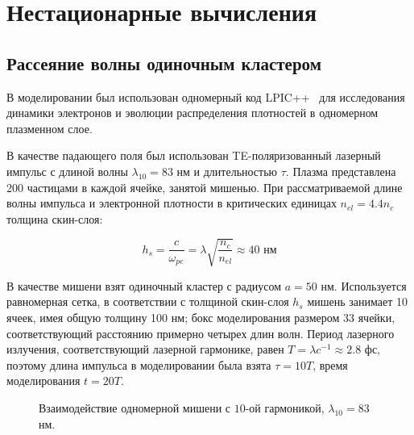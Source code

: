 \section{Нестационарные вычисления}

\subsection{Рассеяние волны одиночным кластером}

В моделировании был использован одномерный код LPIC++~\cite{Pfund1998} для исследования динамики электронов и эволюции распределения плотностей в одномерном плазменном слое.

В качестве падающего поля был использован TE-поляризованный лазерный импульс с длиной волны $\lambda_{10} = 83$ нм и длительностью $\tau$. Плазма представлена 200 частицами в каждой ячейке, занятой мишенью. При рассматриваемой длине волны импульса и электронной плотности в критических единицах $n_{el} = 4.4 n_c$ толщина скин-слоя:

    \begin{equation}
        h_{s} = \frac{c}{\omega_{pe}} = \lambda\sqrt{\frac{n_c}{n_{el}}} \approx40 \textrm{ нм} 
        \label{pic_skin_single}
    \end{equation}

В качестве мишени взят одиночный кластер с радиусом $a = 50$ нм. Используется равномерная сетка, в соответствии с толщиной скин-слоя $h_{s}$ мишень занимает 10 ячеек, имея общую толщину 100 нм; бокс моделирования размером 33 ячейки, соответствующий расстоянию примерно четырех длин волн. Период лазерного излучения, соответствующий лазерной гармонике, равен $T = \lambda c^{-1} \approx 2.8$ фс, поэтому длина импульса в моделировании была взята $\tau = 10T$, время моделирования $t = 20T$. 

    \begin{figure}[htb]
        \caption{Взаимодействие одномерной мишени с $10$-ой гармоникой, $\lambda_{10} = 83$ нм.}\label{lpic_low_high:image}
    \end{figure}

